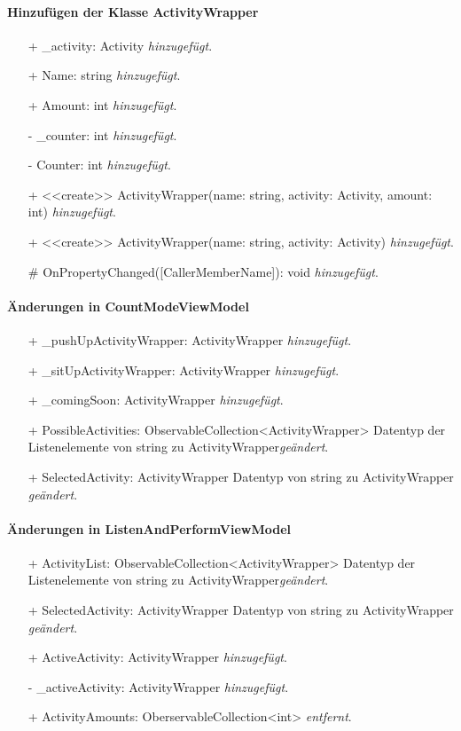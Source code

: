 \documentclass[a4paper,12pt]{article}
\begin{document}
\paragraph{Hinzufügen der Klasse ActivityWrapper}
\begin{itemize}
	\item[+] \_activity: Activity \textit{hinzugefügt}.
	\item[+] Name: string \textit{hinzugefügt}.
	\item[+] Amount: int \textit{hinzugefügt}.
	\item[-] \_counter: int \textit{hinzugefügt}.
	\item[-] Counter: int \textit{hinzugefügt}.
	\item[+] <<create>> ActivityWrapper(name: string, activity: Activity, amount: int) \textit{hinzugefügt}.
	\item[+] <<create>> ActivityWrapper(name: string, activity: Activity) \textit{hinzugefügt}.
	\item[\#] OnPropertyChanged([CallerMemberName]): void \textit{hinzugefügt}.
\end{itemize}
\paragraph{Änderungen in CountModeViewModel}
\begin{itemize}
	\item[+] \_pushUpActivityWrapper: ActivityWrapper \textit{hinzugefügt}.
	\item[+] \_sitUpActivityWrapper: ActivityWrapper \textit{hinzugefügt}.
	\item[+] \_comingSoon: ActivityWrapper \textit{hinzugefügt}.
	\item[+] PossibleActivities: ObservableCollection<ActivityWrapper> Datentyp der Listenelemente von string zu ActivityWrapper\textit{geändert}.
	\item[+] SelectedActivity: ActivityWrapper Datentyp von string zu ActivityWrapper \textit{geändert}.
\end{itemize}
\paragraph{Änderungen in ListenAndPerformViewModel}
\begin{itemize}
	\item[+] ActivityList: ObservableCollection<ActivityWrapper> Datentyp der Listenelemente von string zu ActivityWrapper\textit{geändert}.
	\item[+] SelectedActivity: ActivityWrapper Datentyp von string zu ActivityWrapper \textit{geändert}.
	\item[+] ActiveActivity: ActivityWrapper \textit{hinzugefügt}.
	\item[-] \_activeActivity: ActivityWrapper \textit{hinzugefügt}.
 	\item[+] ActivityAmounts: OberservableCollection<int> \textit{entfernt}. 
\end{itemize}
\end{document}
